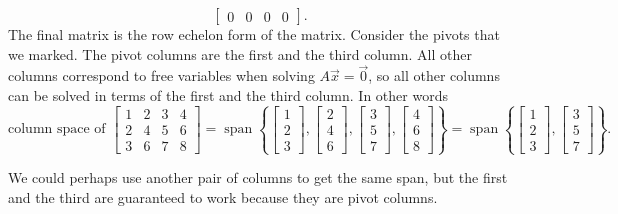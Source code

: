 \documentclass{ximera}
\begin{document}
\begin{exampleSol}
\begin{equation*}
\begin{bmatrix}
        0 & 0 & 0 & 0
    \end{bmatrix} . 
    \end{equation*}
    The final matrix is the row echelon form of the matrix. Consider the pivots that we marked. The pivot columns are the first and the third column.  All other columns correspond to free variables when solving $A \vec{x} = \vec{0}$, so all other columns can be solved in terms of the first and the third column.  In other words
    \begin{equation*}
        \text{column space of }
        \begin{bmatrix}
            1 & 2 & 3 & 4 \\
            2 & 4 & 5 & 6 \\
            3 & 6 & 7 & 8
        \end{bmatrix}
        = \operatorname{span} \left\{
        \begin{bmatrix}
            1 \\
            2 \\
            3 
        \end{bmatrix}
        ,
        \begin{bmatrix}
            2 \\
            4 \\
            6
        \end{bmatrix}
        ,
        \begin{bmatrix}
            3 \\
            5 \\
            7
        \end{bmatrix}
        ,
        \begin{bmatrix}
            4 \\
            6 \\
            8
        \end{bmatrix}
        \right\} = \operatorname{span} \left\{
        \begin{bmatrix}
            1 \\
            2 \\
            3
        \end{bmatrix}
        ,
        \begin{bmatrix}
            3 \\
            5 \\
            7
        \end{bmatrix}
        \right\} .
    \end{equation*}
\end{exampleSol}
We could perhaps use another pair of columns to get the same span, but the first and the third are guaranteed to work because they are pivot columns. 
\end{document}
